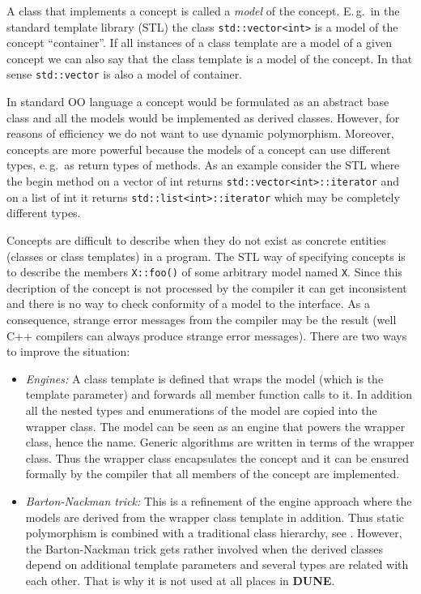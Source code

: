 \documentclass[11pt,a4paper,headinclude,footinclude,DIV16,normalheadings]{scrreprt}
\newcommand{\Dune}{{\sf\bfseries DUNE}\xspace}
\begin{document}
A class that implements a concept is called a
\textit{model} of the concept. E.\,g.~in the standard template library (STL)
the class \lstinline!std::vector<int>! is a model of the concept
``container''. If all instances of a class template are a model of
a given concept we can also say that the class template is a model of
the concept. In that sense \lstinline!std::vector! is also a model of
container.  

In standard OO language a concept would be formulated as
an abstract base class and all the models would be implemented as
derived classes. However, for reasons of efficiency we do not want to
use dynamic polymorphism. Moreover, concepts are more powerful because
the models of a concept can use different types, e.\,g.~as return types of
methods. As an example consider the STL where the begin method on a
vector of int returns \lstinline!std::vector<int>::iterator! and on a
list of int it returns \lstinline!std::list<int>::iterator! which may
be completely different types. 

Concepts are difficult to describe when they do not exist as concrete
entities (classes or class templates) in a program. The STL way of
specifying concepts is to describe the members \lstinline!X::foo()! of
some arbitrary model named \lstinline!X!. Since this decription of the
concept is not processed by the compiler it can get inconsistent and
there is no way to check conformity of a model to the interface. As a
consequence, strange error messages from the compiler may be the
result (well C++ compilers can always produce strange error messages).
There are two ways to improve the situation:
\begin{itemize}
\item \textit{Engines:} A class template is defined that wraps the
  model (which is the template parameter) and forwards all member
  function calls to it. In addition all the nested types and
  enumerations of the model are copied into the wrapper class. 
  The model can be seen as an engine that powers the wrapper class,
  hence the name. Generic
  algorithms are written in terms of the wrapper class. Thus the
  wrapper class encapsulates the concept and it can be ensured
  formally by the compiler that
  all members of the concept are implemented.

\item \textit{Barton-Nackman trick:} This is a refinement of the
  engine approach where the models are derived from the wrapper class
  template in addition. Thus static polymorphism is combined
  with a traditional class hierarchy, see \cite{Veldhui99,BN}. 
  However, the
  Barton-Nackman trick gets rather involved when the derived classes
  depend on additional template parameters and several types are related
  with each other. That is why it is not used at all places in \Dune.
\end{itemize}
\end{document}
